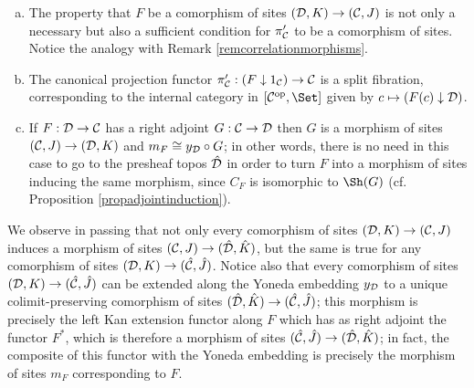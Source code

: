 \documentclass[a4paper,12pt]{article}
\begin{document}
\begin{remarks}\label{remcorrelationcomorphisms}
	\begin{enumerate}[(a)]
		\item The property that $F$ be a comorphism of sites $({\cal D}, K)\to ({\cal C}, J)$ is not only a necessary but also a sufficient condition for $\pi_{\cal C}'$ to be a comorphism of sites. Notice the analogy with Remark \ref{remcorrelationmorphisms}. 
		
		\item The canonical projection functor $\pi_{\cal C}':(F \downarrow 1_{\cal C}) \to {\cal C}$ is a split fibration, corresponding to the internal category in $[{\cal C}^{\textup{op}}, \Set]$ given by $c \mapsto (F(c)\downarrow {\cal D})$.
		
		\item If $F:{\cal D}\to {\cal C}$ has a right adjoint $G:{\cal C}\to {\cal D}$ then $G$ is a morphism of sites $({\cal C}, J)\to ({\cal D}, K)$ and $m_{F}\cong y_{\cal D}\circ G$; in other words, there is no need in this case to go to the presheaf topos $\hat{\cal D}$ in order to turn $F$ into a morphism of sites inducing the same morphism, since $C_{F}$ is isomorphic to $\Sh(G)$ (cf. Proposition \ref{propadjointinduction}). 
	\end{enumerate}	
\end{remarks}

We observe in passing that not only every comorphism of sites $({\cal D}, K)\to ({\cal C}, J)$ induces a morphism of sites $({\cal C}, J)\to (\hat{\cal D}, \hat{K})$, but the same is true for any comorphism of sites $({\cal D}, K)\to (\hat{\cal C}, \hat{J})$. Notice also that every comorphism of sites $({\cal D}, K)\to (\hat{\cal C}, \hat{J})$ can be extended along the Yoneda embedding $y_{\cal D}$ to a unique colimit-preserving comorphism of sites $(\hat{\cal D}, \hat{K})\to (\hat{\cal C}, \hat{J})$; this morphism is precisely the left Kan extension functor along $F$ which has as right adjoint the functor $F^{\ast}$, which is therefore a morphism of sites $(\hat{\cal C}, \hat{J}) \to (\hat{\cal D}, \hat{K})$; in fact, the composite of this functor with the Yoneda embedding is precisely the morphism of sites $m_{F}$ corresponding to $F$.  
\end{document}
